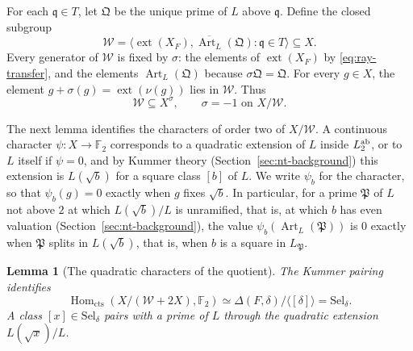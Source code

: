 \documentclass[11pt]{article}
\theoremstyle{plain}
\newtheorem{lemma}[theorem]{Lemma}
\theoremstyle{definition}
\theoremstyle{remark}
\newcommand{\F}{\mathbb F}
\begin{document}
For each $\mathfrak q\in T$, let $\mathfrak Q$ be the unique prime of $L$
above $\mathfrak q$.  Define the closed subgroup
\begin{equation}\label{eq:W-ray}
 \mathcal W=\overline{\langle \operatorname{ext}(X_F),
              \operatorname{Art}_L(\mathfrak Q):\mathfrak q\in T\rangle}
 \subseteq X.
\end{equation}
Every generator of $\mathcal W$ is fixed by $\sigma$: the elements of
$\operatorname{ext}(X_F)$ by \eqref{eq:ray-transfer}, and the elements
$\operatorname{Art}_L(\mathfrak Q)$ because $\sigma\mathfrak Q=\mathfrak Q$.
For every $g\in X$, the element $g+\sigma(g)=\operatorname{ext}(\nu(g))$
lies in $\mathcal W$.  Thus
\begin{equation}\label{eq:ray-inversion}
 \mathcal W\subseteq X^\sigma,\qquad \sigma=-1\text{ on }X/\mathcal W.
\end{equation}

The next lemma identifies the characters of order two of $X/\mathcal W$.
A continuous character $\psi:X\to\F_2$ corresponds to a quadratic
extension of $L$ inside $L^{\rm ab}_2$, or to $L$ itself if $\psi=0$, and
by Kummer theory (Section~\ref{sec:nt-background}) this extension is
$L(\sqrt b)$ for a square class $[b]$ of $L$.  We write $\psi_b$ for the
character, so that $\psi_b(g)=0$ exactly when $g$ fixes $\sqrt b$.  In
particular, for a prime $\mathfrak P$ of $L$ not above $2$ at which
$L(\sqrt b)/L$ is unramified, that is, at which $b$ has even valuation
(Section~\ref{sec:nt-background}), the value
$\psi_b(\operatorname{Art}_L(\mathfrak P))$ is $0$
exactly when $\mathfrak P$ splits in $L(\sqrt b)$, that is, when $b$ is a
square in $L_{\mathfrak P}$.

\begin{lemma}[The quadratic characters of the quotient]\label{lem:ray-selmer}
The Kummer pairing identifies
\begin{equation}\label{eq:ray-selmer}
 \operatorname{Hom}_{\mathrm{cts}}(X/(\mathcal W+2X),\F_2)
 \simeq \Delta(F,\delta)/\langle[\delta]\rangle=\mathrm{Sel}_\delta.
\end{equation}
A class $[x]\in\mathrm{Sel}_\delta$ pairs with a prime of $L$ through the quadratic
extension $L(\sqrt x)/L$.
\end{lemma}
\end{document}
